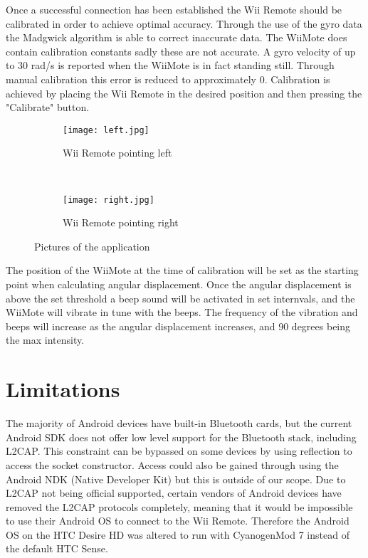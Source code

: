 Once a successful connection has been established the Wii Remote should be calibrated in order to achieve optimal accuracy. Through the use of the gyro data the Madgwick algorithm is able to correct inaccurate data. The WiiMote does contain calibration constants sadly these are not accurate. A gyro velocity of up to 30 rad/s is reported when the WiiMote is in fact standing still. Through manual calibration this error is reduced to approximately 0. Calibration is achieved by placing the Wii Remote in the desired position and then pressing the "Calibrate" button.

\begin{figure}[h!]
        \centering
        \begin{subfigure}[b]{0.8\textwidth}
                \centering
                \texttt{[image: left.jpg]}
                \caption{Wii Remote pointing left}
                \label{fig:left}
        \end{subfigure}
        \\%
        \begin{subfigure}[b]{0.8\textwidth}
                \centering
                \texttt{[image: right.jpg]}
                \caption{Wii Remote pointing right}
                \label{fig:right}
        \end{subfigure}
        \caption{Pictures of the application}\label{fig:application}
\end{figure}

The position of the WiiMote at the time of calibration will be set as the starting point when calculating angular displacement. Once the angular displacement is above the set threshold a beep sound will be activated in set internvals, and the WiiMote will vibrate in tune with the beeps. The frequency of the vibration and beeps will increase as the angular displacement increases, and 90 degrees being the max intensity.

\section{Limitations}
The majority of Android devices have built-in Bluetooth cards, but the current Android SDK does not offer low level support for the Bluetooth stack, including L2CAP. This constraint can be bypassed on some devices by using reflection to access the socket constructor\cite{l2capHtc}. Access could also be gained through using the Android NDK (Native Developer Kit) but this is outside of our scope. Due to L2CAP not being official supported, certain vendors of Android devices have removed the L2CAP protocols completely, meaning that it would be impossible to use their Android OS to connect to the Wii Remote. Therefore the Android OS on the HTC Desire HD was altered to run with CyanogenMod 7 instead of the default HTC Sense.


